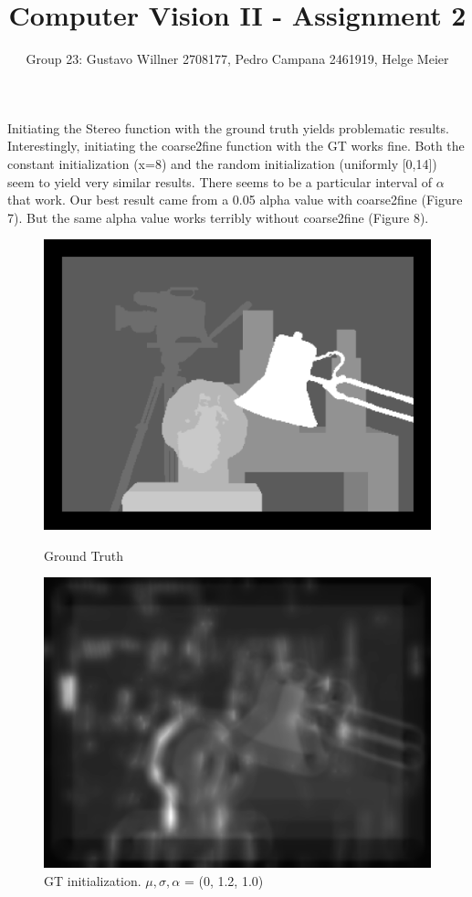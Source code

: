 \documentclass[11pt]{article} %
\title{Computer Vision II - Assignment 2}
\author{Group 23: Gustavo Willner 2708177, Pedro Campana 2461919, Helge Meier }
\date{}
\begin{document}
	\maketitle
Initiating the Stereo function with the ground truth yields problematic results. Interestingly, initiating the coarse2fine function with the GT works fine. Both the constant initialization (x=8) and the random initialization (uniformly [0,14]) seem to yield very similar results.  There seems to be a particular interval of $\alpha$ that work. Our best result came from a 0.05 alpha value with coarse2fine (Figure 7). But the same alpha value works terribly without coarse2fine (Figure 8).
\begin{figure}[ht]
  \centering
  \begin{minipage}[b]{0.45\textwidth}
    \includegraphics[width=\textwidth]{output0.png}
    \caption{Ground Truth}
    \label{fig:image1}
  \end{minipage}
  \hfill
  \begin{minipage}[b]{0.45\textwidth}
    \includegraphics[width=\textwidth]{output2.png}
    \caption{GT initialization. $\mu, \sigma, \alpha$ = (0, 1.2, 1.0)}
    \label{fig:image2}
  \end{minipage}
  \end{figure}
\end{document}
